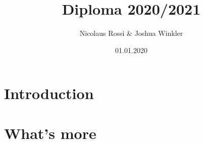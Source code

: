 \documentclass{article}
\begin{document}
\title{Diploma 2020/2021}
\author{Nicolaus Rossi & Joshua Winkler}
\date{01.01.2020}
\maketitle

\section{Introduction}

\section{What's more}

\end{document}

